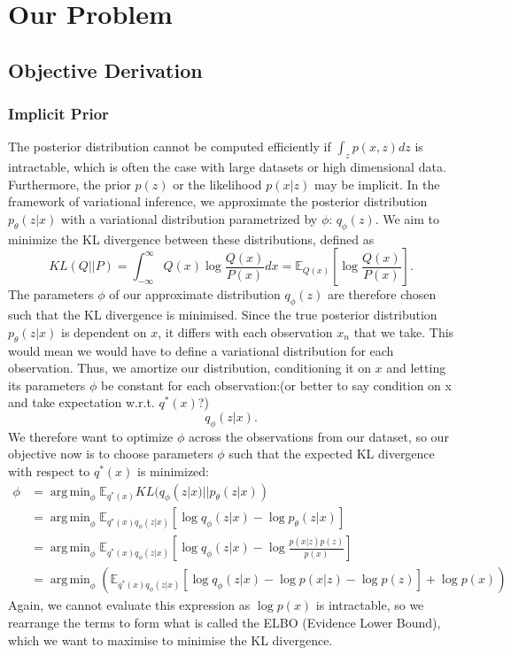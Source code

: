 \documentclass[a4paper,12pt]{article}
\DeclareMathOperator*{\argmin}{arg\,min}
\numberwithin{equation}{section}
\begin{document}
\section{Our Problem}
\subsection{Objective Derivation}
\subsubsection{Implicit Prior}
The posterior distribution cannot be computed efficiently if $\int_z p(x,z)dz$ is intractable, which is often the case with large datasets or high dimensional data. Furthermore, the prior $p(z)$ or the likelihood $p(x|z)$ may be implicit. In the framework of variational inference, we approximate the posterior distribution $p_\theta (z|x)$ with a variational distribution parametrized by $\phi$: $q_\phi (z)$. We aim to minimize the KL divergence between these distributions, defined as 
\[KL(Q||P)=\int_{-\infty}^\infty Q(x)\log \frac{Q(x)}{P(x)}dx=\mathbb{E}_{Q(x)}\left[\log\frac{Q(x)}{P(x)}\right].\]
The parameters $\phi$ of our approximate distribution $q_\phi (z)$ are therefore chosen such that the KL divergence is minimised. Since the true posterior distribution $p_\theta(z|x)$ is dependent on $x$, it differs with each observation $x_n$ that we take. This would mean we would have to define a variational distribution for each observation. Thus, we amortize our distribution, conditioning it on $x$ and letting its parameters $\phi$ be constant for each observation:(or better to say condition on x and take expectation w.r.t. $q^*(x)$?)
\[q_\phi(z|x).\]
We therefore want to optimize $\phi$ across the observations from our dataset, so our objective now is to choose parameters $\phi$ such that the expected KL divergence with respect to $q^*(x)$ is minimized:
\begin{align*}
\phi &=\argmin_\phi \mathbb{E}_{q^*(x)}KL(q_\phi(z|x)||p_\theta (z|x))\\
&= \argmin_\phi \mathbb{E}_{q^*(x)q_\phi (z|x)}\left[\log q_\phi(z|x)-\log p_\theta(z|x)\right]\\
&=\argmin_\phi\mathbb{E}_{q^*(x)q_\phi (z|x)}\left[\log q_\phi(z|x)-\log \frac{p(x|z)p(z)}{p(x)}\right]\\
&=\argmin_\phi\left(\mathbb{E}_{q^*(x)q_\phi (z|x)}\left[\log q_\phi(z|x)-\log p(x|z)-\log p(z)\right]+\log p(x)\right)
\end{align*}
Again, we cannot evaluate this expression as $\log p(x)$ is intractable, so we rearrange the terms to form what is called the ELBO (Evidence Lower Bound), which we want to maximise to minimise the KL divergence.
\end{document}
